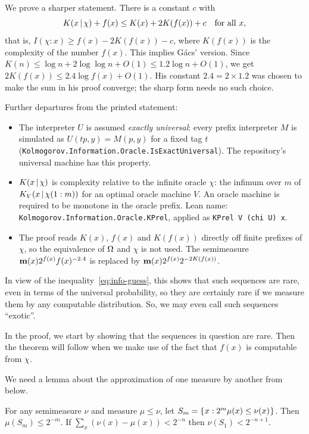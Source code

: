\begin{formalization}
We prove a sharper statement. There is a constant \( c \) with
 \[
   K(x \,\vert\, \chi) + f(x) \le K(x) + 2K(f(x)) + c
   \quad\text{for all } x,
 \]
that is, \( I(\chi : x) \ge f(x) - 2K(f(x)) - c \), where \( K(f(x)) \) is the
complexity of the number \( f(x) \). This implies G\'acs' version. Since
\( K(n) \le \log n + 2\log\log n + O(1) \le 1.2 \log n + O(1) \), we get
\( 2K(f(x)) \le 2.4 \log f(x) + O(1) \). His constant \( 2.4 = 2 \times 1.2 \)
was chosen to make the sum in his proof converge; the sharp form needs no such choice.

Further departures from the printed statement:
 \begin{itemize}
 \item The interpreter \( U \) is assumed \emph{exactly universal}: every prefix
  interpreter \( M \) is simulated as \( U(tp, y) = M(p, y) \) for a fixed tag \( t \)
  (\texttt{Kolmogorov.Information.Oracle.IsExactUniversal}). The repository's universal
  machine has this property.
 \item \( K(x \,\vert\, \chi) \) is complexity relative to the infinite oracle \( \chi \): the
  infimum over \( m \) of \( K_V(x \,\vert\, \chi(1:m)) \) for an optimal oracle machine \( V \).
  An oracle machine is required to be monotone in the oracle prefix. Lean name:
  \texttt{Kolmogorov.Information.Oracle.KPrel}, applied as \texttt{KPrel V (chi U) x}.
 \item The proof reads \( K(x) \), \( f(x) \) and \( K(f(x)) \) directly off finite prefixes
  of \( \chi \), so the equivalence of \( \Omega \) and \( \chi \) is not used. The
  semimeasure \( \mathbf{m}(x) 2^{f(x)} f(x)^{-2.4} \) is replaced by
  \( \mathbf{m}(x) 2^{f(x)} 2^{-2K(f(x))} \).
 \end{itemize}
\end{formalization}

In view of the inequality~\eqref{eq:info-guess}, this shows that such
sequences are rare, even in terms of the universal probability, so
they are certainly rare if we measure them by any
computable distribution.
So, we may even call such sequences ``exotic''.

In the proof, we
start by showing that the sequences in question are rare.
Then the theorem will follow when we make use of the fact that
\( f(x) \) is computable from \( \chi \).

We need a lemma about the approximation of one measure by another from
below.

  \begin{lemma}\label{lem:measure-approx}
  \leanok
For any semimeasure \( \nu \) and measure \( \mu \le \nu \), let
\( S_{m} = \mathopen\{\mskip 1mu x : 2^{m} \mu(x) \le \nu(x)\mskip 1mu\mathclose\} \).
Then \( \mu(S_{m}) \le 2^{-m} \).
If \( \sum_{x} (\nu(x) - \mu(x)) < 2^{-n} \) then \( \nu(S_{1}) < 2^{-n+1} \).
  \end{lemma}

